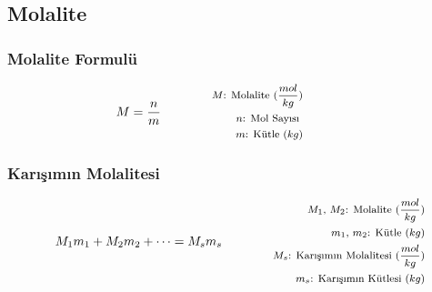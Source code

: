 \subsection{Molalite}

\subsubsection*{Molalite Formulü}
\begin{equation}
    M = \frac{n}{m} \qquad \qquad \parbox{4cm}{\footnotesize$\begin{aligned}
        M\text{: Molalite (} \frac{mol}{kg} \text{)} \\
        n\text{: Mol Sayısı } \\
        m\text{: Kütle } (kg) \\
\end{aligned}$}
\end{equation}

\subsubsection*{Karışımın Molalitesi}
\begin{equation}
    M_1 m_1 + M_2 m_2 + \cdots = M_s m_s \qquad \qquad \parbox{4cm}{\footnotesize$\begin{aligned}
        M_1\text{, }M_2\text{: Molalite (} \frac{mol}{kg} \text{)} \\
        m_1\text{, }m_2\text{: Kütle } (kg) \\
        M_s\text{: Karışımın Molalitesi (} \frac{mol}{kg} \text{)} \\
        m_s\text{: Karışımın Kütlesi } (kg) \\
\end{aligned}$}
\end{equation}